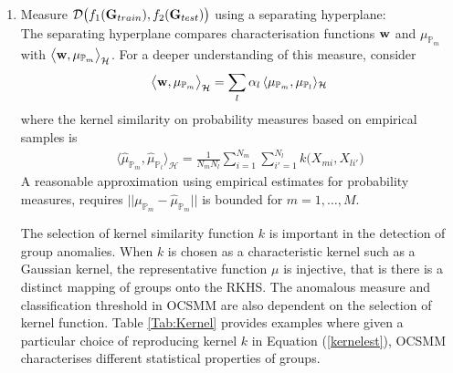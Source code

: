 \begin{enumerate}[3.]
\item Measure $ \mathcal{D}\big( f_1({\bf G}_{train}), f_2({\bf G}_{test})\big )$ using a separating hyperplane: \\
The separating hyperplane compares characterisation functions ${\bf w}$ and $\mu_{\mathbb{P}_m }  $ with
$ \big\langle {\bf w},\mu_{\mathbb{P}_m } \big \rangle_\mathcal{H}%
$.   
 For a deeper understanding of this measure, consider  
\begin{align*}
 \big\langle {\bf w},\mu_{\mathbb{P}_m } \big \rangle_\mathcal{H}= \sum_{l} \alpha_l \, \langle \mu_{\mathbb{P}_m}, \mu_{\mathbb{P}_l}\rangle_\mathcal{H} 
\end{align*} 
where the kernel similarity on probability measures based on empirical samples is 
\begin{align}
\langle \hat{\mu}_{\mathbb{P}_m},\hat{\mu}_{\mathbb{P}_l} \rangle_\mathcal{H}  
=
\frac{1}{N_m   N_l } \sum_{i=1}^{N_m}
 \sum_{i'=1}^{N_l} k\Big( X_{mi} , 
 X_{li'}  \Big)  \label{kernelest}
 \end{align}
A reasonable approximation using empirical estimates for probability measures, requires   $||  \mu_{\mathbb{P}_m}  - \hat{\mu}_{ \mathbb{P}_m}  || $ is bounded   for $m=1,\dots,M$.   

  The selection of kernel similarity function $k$ is important in the detection of group anomalies.
When $k$ is chosen as a characteristic kernel such as a  Gaussian   kernel, the representative function $\mu$ is injective, that is there is a distinct mapping of groups onto the RKHS. The anomalous measure and classification threshold in  OCSMM are also dependent on the selection of kernel function. Table \ref{Tab:Kernel} provides examples where given a particular choice of reproducing kernel  $k$ in Equation (\ref{kernelest}), OCSMM characterises different statistical properties of  groups. 


\end{enumerate}

